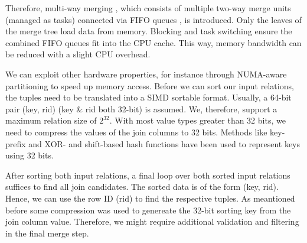 Therefore, multi-way
merging \cite{Balkesen}, which consists of multiple two-way merge units (managed as tasks) connected via FIFO queues
, is introduced. Only the leaves of the merge tree load data from memory. Blocking and task switching 
ensure the combined FIFO queues fit into the CPU cache. This way, memory bandwidth can be reduced
with a slight CPU overhead. 

We can exploit other hardware properties, for instance through 
NUMA-aware partitioning to speed up memory access.
Before we can sort our input relations, the tuples need to be translated into a SIMD sortable
format. Usually, a 64-bit pair (key, rid) (key \& rid both 32-bit) is assumed. We, therefore,
support a maximum relation size of $2^{32}$. With most value types greater
than 32 bits, we need to compress the values of the join columns to 32 bits. Methods like 
key-prefix \cite{chris_nyberg__1994} and XOR- and shift-based hash functions \cite{1319989} have 
been used to represent keys using 32 bits.

After sorting both input relations, a final loop over both sorted input relations suffices to find all
join candidates. The sorted data is of the form (key, rid). Hence, we can use the row ID (rid) to
find the respective tuples. As meantioned before some compression was used to genereate the 32-bit
sorting key from the join column value. Therefore, we might require additional validation and 
filtering in the final merge step.
